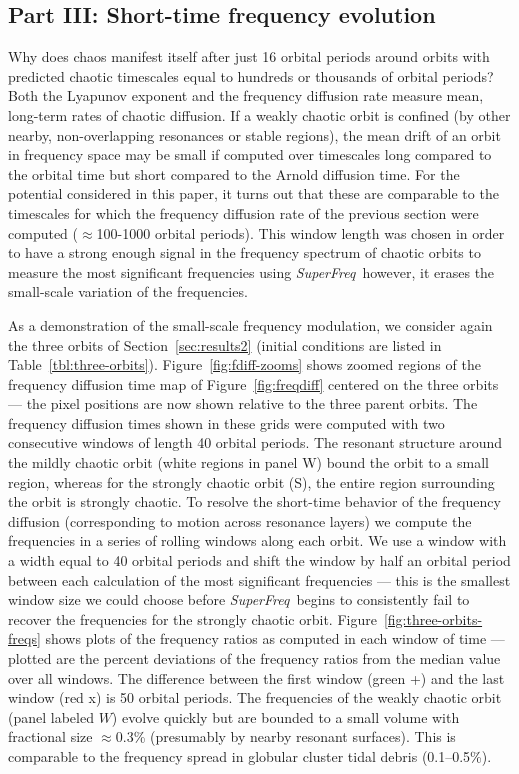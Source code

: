 \documentclass[letterpaper,12pt,preprint]{aastex}
\newcommand{\project}[1]{\textsl{#1}}
\newcommand{\superfreq}{\project{SuperFreq}}
\begin{document}
\subsection{Part III: Short-time frequency evolution}\label{sec:results3}

Why does chaos manifest itself after just 16 orbital periods around orbits with predicted chaotic timescales equal to hundreds or thousands of orbital periods? Both the Lyapunov exponent and the frequency diffusion rate measure mean, long-term rates of chaotic diffusion. If a weakly chaotic orbit is confined (by other nearby, non-overlapping resonances or stable regions), the mean drift of an orbit in frequency space may be small if computed over timescales long compared to the orbital time but short compared to the Arnold diffusion time. For the potential considered in this paper, it turns out that these are comparable to the timescales for which the frequency diffusion rate of the previous section were computed ($\approx$100-1000 orbital periods). This window length was chosen in order to have a strong enough signal in the frequency spectrum of chaotic orbits to measure the most significant frequencies using \superfreq\, however, it erases the small-scale variation of the frequencies. 

As a demonstration of the small-scale frequency modulation, we consider again the three orbits of Section~\ref{sec:results2} (initial conditions are listed in Table~\ref{tbl:three-orbits}). Figure~\ref{fig:fdiff-zooms} shows zoomed regions of the frequency diffusion time map of Figure~\ref{fig:freqdiff} centered on the three orbits --- the pixel positions are now shown relative to the three parent orbits. The frequency diffusion times shown in these grids were computed with two consecutive windows of length 40 orbital periods. The resonant structure around the mildly chaotic orbit (white regions in panel W) bound the orbit to a small region, whereas for the strongly chaotic orbit (S), the entire region surrounding the orbit is strongly chaotic. To resolve the short-time behavior of the frequency diffusion (corresponding to motion across resonance layers) we compute the frequencies in a series of rolling windows along each orbit. We use a window with a width equal to 40 orbital periods and shift the window by half an orbital period between each calculation of the most significant frequencies --- this is the smallest window size we could choose before \superfreq\ begins to consistently fail to recover the frequencies for the strongly chaotic orbit.  Figure~\ref{fig:three-orbits-freqs} shows plots of the frequency ratios as computed in each window of time --- plotted are the percent deviations of the frequency ratios from the median value over all windows. The difference between the first window (green +) and the last window (red x) is 50 orbital periods. The frequencies of the weakly chaotic orbit (panel labeled $W$) evolve quickly but are bounded to a small volume with fractional size $\approx$0.3\% (presumably by nearby resonant surfaces). This is comparable to the frequency spread in globular cluster tidal debris (0.1--0.5\%).
\end{document}
